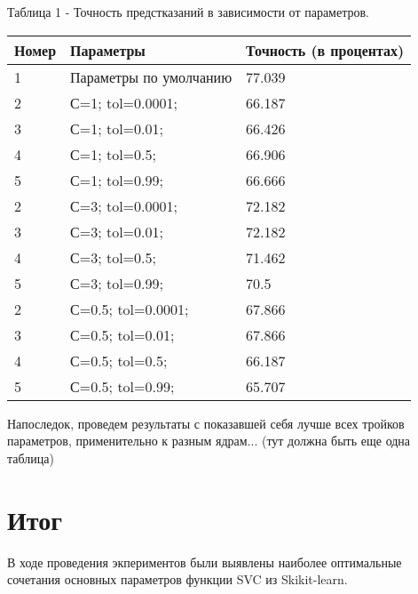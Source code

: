 \documentclass[a4paper,12pt]{article}
\begin{document}
	\vspace{0.5cm}
	Таблица 1 - Точность предстказаний в зависимости от параметров.
\begin{longtable}{|p{0.5cm}|p{10cm}|p{3cm}|}
Номер & Параметры & Точность (в процентах) \\ 
\hline 
1 & Параметры по умолчанию & 77.039 \\
\hline
2 & С=1; tol=0.0001; & 66.187 \\
\hline 
3 & С=1; tol=0.01; & 66.426 \\
\hline 
4 &  С=1; tol=0.5;  & 66.906 \\
\hline 
5 & С=1; tol=0.99;  & 66.666 \\
\hline
2 & С=3; tol=0.0001; & 72.182 \\
\hline 
3 & С=3; tol=0.01; & 72.182 \\
\hline 
4 &  С=3; tol=0.5;  & 71.462 \\
\hline 
5 & С=3; tol=0.99;  & 70.5 \\
\hline
2 & С=0.5; tol=0.0001; & 67.866 \\
\hline 
3 & С=0.5; tol=0.01; & 67.866 \\
\hline 
4 & С=0.5; tol=0.5;  & 66.187 \\
\hline 
5 & С=0.5; tol=0.99;  & 65.707 \\
\hline 
\end{longtable}

	\vspace{0.5cm}
	Напоследок, проведем результаты с показавшей себя лучше всех тройков параметров, применительно к разным ядрам...
	(тут должна быть еще одна таблица)


\newpage\section{Итог}
	В ходе проведения экпериментов были выявлены наиболее оптимальные сочетания основных параметров функции SVC из Skikit-learn. 
	
	
\end{document}
